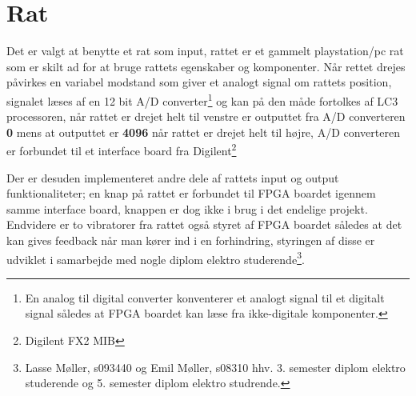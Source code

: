 \section{Rat}
Det er valgt at benytte et rat som input, rattet er et gammelt playstation/pc rat som er skilt ad for at bruge rattets egenskaber og komponenter. Når rettet drejes påvirkes en variabel modstand som giver et analogt signal om rattets position, signalet læses af en 12 bit A/D converter\footnote{En analog til digital converter konventerer et analogt signal til et digitalt signal således at FPGA boardet kan læse fra ikke-digitale komponenter.} og kan på den måde fortolkes af LC3 processoren, når rattet er drejet helt til venstre er outputtet fra A/D converteren \textbf{0} mens at outputtet er \textbf{4096} når rattet er drejet helt til højre, A/D converteren er forbundet til et interface board fra Digilent\textregistered\footnote{Digilent FX2 MIB}

Der er desuden implementeret andre dele af rattets input og output funktionaliteter; en knap på rattet er forbundet til FPGA boardet igennem samme interface board, knappen er dog ikke i brug i det endelige projekt. Endvidere er to vibratorer fra rattet også styret af FPGA boardet således at det kan gives feedback når man kører ind i en forhindring, styringen af disse er udviklet i samarbejde med nogle diplom elektro studerende\footnote{Lasse Møller, s093440 og Emil Møller, s08310 hhv. 3. semester diplom elektro studerende og 5. semester diplom elektro studrende.}.